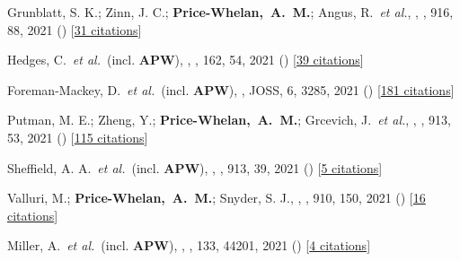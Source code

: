 {\item[{\color{deemph}\scriptsize88}]Grunblatt, S. K.; Zinn, J. C.; \textbf{Price-Whelan,~A.~M.}; Angus, R.~\textit{et al.}, , \apj, 916, 88, 2021 () [\href{http://adsabs.harvard.edu/abs/2021ApJ...916...88G}{31 citations}]

\item[{\color{deemph}\scriptsize87}]Hedges, C.~\textit{et al.}~(incl. \textbf{APW}), , \aj, 162, 54, 2021 () [\href{http://adsabs.harvard.edu/abs/2021AJ....162...54H}{39 citations}]

\item[{\color{deemph}\scriptsize86}]Foreman-Mackey, D.~\textit{et al.}~(incl. \textbf{APW}), , JOSS, 6, 3285, 2021 () [\href{http://adsabs.harvard.edu/abs/2021JOSS....6.3285F}{181 citations}]

\item[{\color{deemph}\scriptsize85}]Putman, M. E.; Zheng, Y.; \textbf{Price-Whelan,~A.~M.}; Grcevich, J.~\textit{et al.}, , \apj, 913, 53, 2021 () [\href{http://adsabs.harvard.edu/abs/2021ApJ...913...53P}{115 citations}]

\item[{\color{deemph}\scriptsize84}]Sheffield, A. A.~\textit{et al.}~(incl. \textbf{APW}), , \apj, 913, 39, 2021 () [\href{http://adsabs.harvard.edu/abs/2021ApJ...913...39S}{5 citations}]

\item[{\color{deemph}\scriptsize83}]Valluri, M.; \textbf{Price-Whelan,~A.~M.}; Snyder, S. J., , \apj, 910, 150, 2021 () [\href{http://adsabs.harvard.edu/abs/2021ApJ...910..150V}{16 citations}]

\item[{\color{deemph}\scriptsize82}]Miller, A.~\textit{et al.}~(incl. \textbf{APW}), , \pasp, 133, 44201, 2021 () [\href{http://adsabs.harvard.edu/abs/2021PASP..133d4201M}{4 citations}]

}
